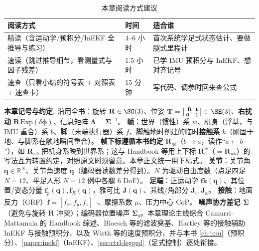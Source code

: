 \begin{table}[H]\centering\small
\caption{本章阅读方式建议}
\label{tab:leg-reading}
\begin{tabular}{lll}
\toprule
阅读方式 & 时间 & 适合谁 \\
\midrule
精读（含运动学/预积分/InEKF 全推导与练习） & 4--6 小时 & 首次系统学足式状态估计、要做腿式里程计 \\
速读（跳过推导细节，看测量式与因子残差） & 1.5 小时 & 已学 IMU 预积分与 InEKF、想对齐记号 \\
速查（只看小结的符号表 + 对照表 + 速查卡） & 15 分钟 & 写代码、调参时回来查公式 \\
\bottomrule
\end{tabular}
\end{table}

\begin{note}
\textbf{本章记号与约定.}\;
沿用全书：旋转 $\mathbf{R}\in\SO(3)$、位姿 $\mathbf{T}=\big[\begin{smallmatrix}\mathbf{R}&\mathbf{t}\\\mathbf{0}^\top&1\end{smallmatrix}\big]\in\SE(3)$、\textbf{右扰动} $\mathbf{R}\,\mathrm{Exp}(\delta\boldsymbol{\phi})$、信息矩阵 $\boldsymbol{\Lambda}=\boldsymbol{\Sigma}^{-1}$。
\textbf{帧}：世界（惯性）系 $w$、机身（浮基，与 IMU 重合）系 $b$、脚（末端执行器）系 $f$、脚触地时创建的临时\textbf{接触系} $k$（刚固于地、与脚系在触地瞬间重合）。
\textbf{帧下标遵循本书约定} $\mathbf{R}_{ab}$（$b\to a$，读作“$a\leftarrow b$”），如 $\mathbf{R}_{wb}$ 把机身系映到世界系；这与 Handbook\cite{carlone2026handbook} 等用上下标 $\mathbf{R}_b^w$（$=\mathbf{R}_{wb}$）的写法互为转置约定，对照原文时须留意。本章正文统一用下标式。
\textbf{关节}：关节角 $\mathbf{q}\in\mathbb{R}^N$、关节角速度 $\dot{\mathbf{q}}$（编码器读数差分得到）。$N$ 为驱动自由度数（点足四足 $N{=}12$、平足人形 $N{=}12$ 例中各腿 $6$ DoF）。
\textbf{足端}：正运动学 $\mathbf{fk}(\mathbf{q})$、其位置/姿态分量 $\mathbf{f}_p(\mathbf{q}),\mathbf{f}_R(\mathbf{q})$，雅可比 $\mathbf{J}(\mathbf{q})$、其线/角部分 $\mathbf{J}_v,\mathbf{J}_\omega$。
\textbf{接触}：地面反力（GRF）$\mathbf{f}=[f_x,f_y,f_z]^\top$、摩擦系数 $\mu$、压力中心 CoP。
\textbf{噪声协方差记 $\boldsymbol{\Sigma}$}（避免与旋转 $\mathbf{R}$ 冲突）；编码器位置噪声 $\boldsymbol{\Sigma}_q$。本章理论主线综合 Camurri--Mattamala 的 Handbook 综述\cite{carlone2026handbook}、Bloesch 等的滤波奠基\cite{bloesch2013state}、Hartley 等的接触辅助 InEKF 与接触预积分\cite{hartley2020contact,hartley2018legged}、以及 Wisth 等的速度预积分\cite{wisth2023vilens}，并与本书 \cref{ch:imu}（预积分）、\cref{paper:inekf}（InEKF）、\cref{sec:ctrl-legged}（足式控制）逐处衔接。
\end{note}

